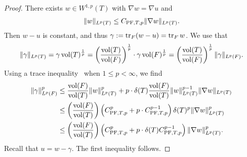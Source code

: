 \documentclass[10pt,letterpaper]{article}
\begin{document}
\begin{proof}
    There exists $w \in W^{1,p}(T)$ with $\nabla w = \nabla u$ and 
    \begin{gather*}
        \| w \|_{L^{p}(T)}
        \leq 
        C_{\PF,T,p} 
        \| \nabla w \|_{L^{p}(T)} %
        .
    \end{gather*}
    Then $w-u$ is constant, and thus $\gamma := \operatorname{tr}_{F} (w-u) = \operatorname{tr}_{F} w$. 
    We use that 
    \begin{gather*}
        \| \gamma \|_{L^{p}(T)}
        =
        \gamma \operatorname{vol}(T)^\frac{1}{p}
        =
        \left( \frac{ \operatorname{vol}(T) }{ \operatorname{vol}(F) } \right)^\frac{1}{p}
        \cdot 
        \gamma 
        \operatorname{vol}(F)^\frac{1}{p}
        =
        \left( \frac{ \operatorname{vol}(T) }{ \operatorname{vol}(F) } \right)^\frac{1}{p}
        \| \gamma \|_{L^{p}(F)}
        .
    \end{gather*}
    Using a trace inequality~\cite[Lemma~2.8]{veeser2012poincare} when $1 \leq p < \infty$, we find 
    \begin{align*}
        \| \gamma \|_{L^{p}(F)}^{p}
        &
        \leq 
        \frac{ \operatorname{vol}(F) }{ \operatorname{vol}(T) }
        \| w \|_{L^{p}(T)}^{p}
        +
        p
        \cdot 
        {\delta}(T)
        \frac{ \operatorname{vol}(F) }{ \operatorname{vol}(T) }
        \| w \|_{L^{p}(T)}^{p-1}
        \| \nabla w \|_{L^{p}(T)}
        \\&
        \leq 
        \left( \frac{ \operatorname{vol}(F) }{ \operatorname{vol}(T) } \right)
        \left( C_{{\rm PF},T,p}^{p} + p \cdot C_{{\rm PF},T,p}^{p-1} \right) 
        {\delta}(T)^{p}
        \| \nabla w \|_{L^{p}(T)}^{p}
        \\&
        \leq 
        \left( \frac{ \operatorname{vol}(F) }{ \operatorname{vol}(T) } \right)
        \left( C_{{\rm PF},T,p}^{p} + p \cdot {\delta}(T) C_{{\rm PF},T,p}^{p-1} \right) 
        \| \nabla w \|_{L^{p}(T)}^{p}
        .
    \end{align*}
    Recall that $u = w - \gamma$. The first inequality follows. 
    

\end{proof}
\end{document}
